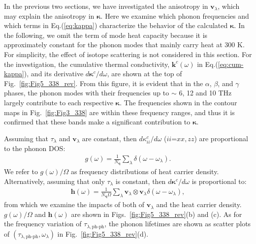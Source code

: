 \documentclass[twocolumn,amsmath,amssymb,a4paper,prb,superscriptaddress,floatfix]{revtex4-1}
\begin{document}
In the previous two sections, we have investigated the anisotropy in
$\mathbf{v}_\lambda$, which may explain the anisotropy in
$\boldsymbol{\kappa}$.  Here we examine which phonon frequencies and which
terms in Eq.(\ref{eq:kappa}) characterize the behavior of the calculated
$\boldsymbol{\kappa}$. In the following, we omit the term of mode heat
capacity because it is approximately constant for the phonon modes that mainly
carry heat at 300 K.  For simplicity, the effect of isotope scattering is not
considered in this section. For the investigation, the cumulative thermal
conductivity, $\boldsymbol{k}^c(\omega)$ in Eq.(\ref{eq:cum-kappa}), and its
derivative $d\boldsymbol{\kappa}^c/d\omega$, are shown at the top of
Fig.~\ref{fig:Fig5_338_rev}. From this figure, it is evident that in the
$\alpha$, $\beta$, and $\gamma$ phases, the phonon modes with their frequencies
up to $\sim$ 6, 12 and 10 THz largely contribute to each respective
$\boldsymbol{\kappa}$. The frequencies shown in the contour maps in
Fig.~\ref{fig:Fig3_338} are within these frequency ranges, and thus it is
confirmed that these bands make a significant contribution to
$\boldsymbol{\kappa}$.  

Assuming that $\tau_\lambda$ and $\mathbf{v}_\lambda$ are constant, then
$d\kappa_{ii}^c/d\omega$ ($ii$=$xx,zz$) are proportional to the phonon
DOS: 
\begin{align}
 \label{eq:dos}
 g(\omega) = \frac{1}{N_\mathbf{q}}
 \sum_\lambda
 \delta(\omega-\omega_{\lambda}).
\end{align}
We refer to $g(\omega)/\Omega$ as frequency distributions of heat
carrier density. Alternatively, assuming that only $\tau_\lambda$ is constant,
then $d\boldsymbol{\kappa}^c/d\omega$ is proportional to:
\begin{align}
 \label{eq:wdos}
 \boldsymbol{h}(\omega) = \frac{1}{N_\mathbf{q}\Omega}
 \sum_\lambda
 \mathbf{v}_\lambda \otimes \mathbf{v}_\lambda
 \delta(\omega-\omega_{\lambda}),
\end{align}
from which we examine the impacts of both of $\mathbf{v}_\lambda$ and the heat carrier
density. $g(\omega)/\Omega$ and  $\boldsymbol{h}(\omega)$
are shown in
Figs.~\ref{fig:Fig5_338_rev}(b) and (c). As for the frequency
variation of $\tau_{\lambda,\text{ph-ph}}$, the phonon lifetimes are shown as scatter
plots of $(\tau_{\lambda,\text{ph-ph}},\omega_\lambda)$ in Fig.~\ref{fig:Fig5_338_rev}(d).
\end{document}
